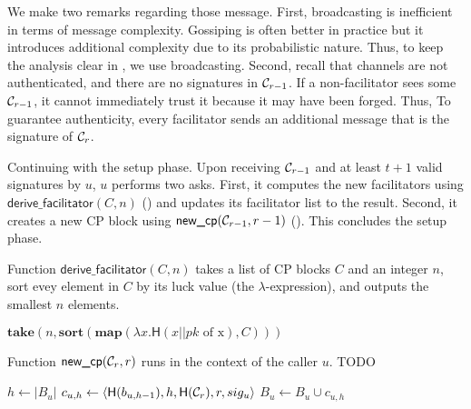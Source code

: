 We make two remarks regarding those message.
First, broadcasting is inefficient in terms of message  complexity.
Gossiping is often better in practice but it introduces additional complexity due to its probabilistic nature.
Thus, to keep the analysis clear in , we use broadcasting.
Second, recall that channels are not authenticated, 
and there are no signatures in $\mathcal{C}_{r - 1}$.
If a non-facilitator sees some $\mathcal{C}_{r - 1}$, it cannot immediately trust it because it may have been forged.
Thus, To guarantee authenticity, every facilitator sends an additional message that is the signature of $\mathcal{C}_r$.

Continuing with the setup phase.
Upon receiving $\mathcal{C}_{r - 1}$ and at least $t + 1$ valid signatures by $u$, $u$ performs two asks.
First, it computes the new facilitators using $\textsf{derive\_facilitator}(C, n)$ ()
and updates its facilitator list to the result.
Second, it creates a new CP block using $\textsf{new\_cp}(\mathcal{C}_{r - 1}, r - 1)$ ().
This concludes the setup phase.

\begin{algorithm}
\caption{Function $\textsf{derive\_facilitator}(C, n)$ takes a list of CP blocks $C$ and an integer $n$,
sort evey element in $C$ by its luck value (the $\lambda$-expression), and outputs the smallest $n$ elements.}
\label{alg:facilitator}
\begin{algorithmic}
\State $\textbf{take} (n, \textbf{sort} (\textbf{map}(\lambda x.\textsf{H}(x || pk \text{ of x}), C)))$
\end{algorithmic}
\end{algorithm}

\begin{algorithm}
\caption{Function $\textsf{new\_cp}(\mathcal{C}_r, r)$ runs in the context of the caller $u$. TODO}
\label{alg:new-cp}
\begin{algorithmic}
\State $h \gets |B_u|$
\State $c_{u, h} \gets \langle \textsf{H}(b_{u, h-1}), h, \textsf{H}(\mathcal{C}_r), r, sig_u \rangle$
\State $B_u \gets B_u \cup c_{u, h}$
\end{algorithmic}
\end{algorithm}

